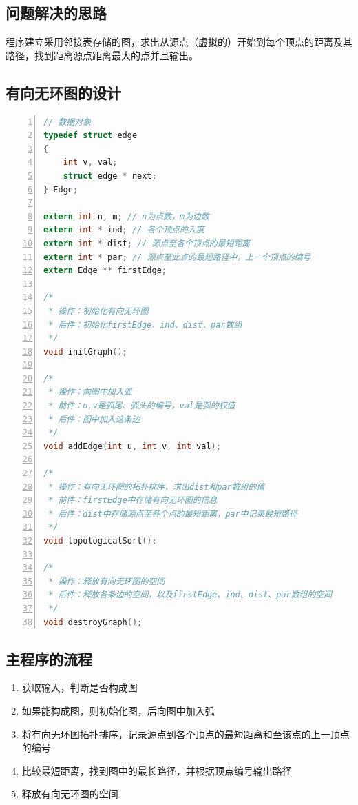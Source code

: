 \documentclass{article}
\begin{document}
\subsection{问题解决的思路}

程序建立采用邻接表存储的图，求出从源点（虚拟的）开始到每个顶点的距离及其路径，找到距离源点距离最大的点并且输出。

\subsection{有向无环图的设计}

\begin{lstlisting}[language={C},
    numbers=left,
    numberstyle=\tiny\consolas,
    basicstyle=\small\consolas]
// 数据对象
typedef struct edge
{
    int v, val;
    struct edge * next;
} Edge;

extern int n, m; // n为点数，m为边数
extern int * ind; // 各个顶点的入度
extern int * dist; // 源点至各个顶点的最短距离
extern int * par; // 源点至此点的最短路径中，上一个顶点的编号
extern Edge ** firstEdge;

/*
 * 操作：初始化有向无环图
 * 后件：初始化firstEdge、ind、dist、par数组
 */
void initGraph();

/*
 * 操作：向图中加入弧
 * 前件：u,v是弧尾、弧头的编号，val是弧的权值
 * 后件：图中加入这条边
 */
void addEdge(int u, int v, int val);

/*
 * 操作：有向无环图的拓扑排序，求出dist和par数组的值
 * 前件：firstEdge中存储有向无环图的信息
 * 后件：dist中存储源点至各个点的最短距离，par中记录最短路径
 */
void topologicalSort();

/*
 * 操作：释放有向无环图的空间
 * 后件：释放各条边的空间，以及firstEdge、ind、dist、par数组的空间
 */
void destroyGraph();
\end{lstlisting}

\subsection{主程序的流程}

\begin{enumerate}
    \item 获取输入，判断是否构成图
    \item 如果能构成图，则初始化图，后向图中加入弧
    \item 将有向无环图拓扑排序，记录源点到各个顶点的最短距离和至该点的上一顶点的编号
    \item 比较最短距离，找到图中的最长路径，并根据顶点编号输出路径
    \item 释放有向无环图的空间
\end{enumerate}
\end{document}
